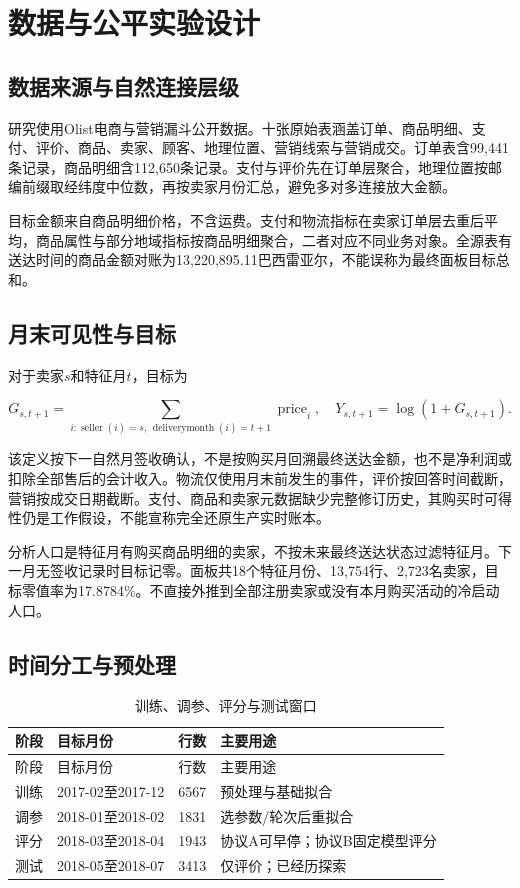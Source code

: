 \documentclass{sufethesismas}
\begin{document}
\chapter{数据与公平实验设计}

\section{数据来源与自然连接层级}

研究使用Olist电商与营销漏斗公开数据\cite{olist2018,funnel2018}。十张原始表涵盖订单、商品明细、支付、评价、商品、卖家、顾客、地理位置、营销线索与营销成交。订单表含99,441条记录，商品明细含112,650条记录。支付与评价先在订单层聚合，地理位置按邮编前缀取经纬度中位数，再按卖家月份汇总，避免多对多连接放大金额。

目标金额来自商品明细价格，不含运费。支付和物流指标在卖家订单层去重后平均，商品属性与部分地域指标按商品明细聚合，二者对应不同业务对象。全源表有送达时间的商品金额对账为13,220,895.11巴西雷亚尔，不能误称为最终面板目标总和。

\section{月末可见性与目标}

对于卖家\(s\)和特征月\(t\)，目标为

\[
G_{s,t+1}=\sum_{i:\operatorname{seller}(i)=s,\,
\operatorname{deliverymonth}(i)=t+1}\operatorname{price}_i,
\quad Y_{s,t+1}=\log(1+G_{s,t+1}).
\]

该定义按下一自然月签收确认，不是按购买月回溯最终送达金额，也不是净利润或扣除全部售后的会计收入。物流仅使用月末前发生的事件，评价按回答时间截断，营销按成交日期截断。支付、商品和卖家元数据缺少完整修订历史，其购买时可得性仍是工作假设，不能宣称完全还原生产实时账本。

分析人口是特征月有购买商品明细的卖家，不按未来最终送达状态过滤特征月。下一月无签收记录时目标记零。面板共18个特征月份、13,754行、2,723名卖家，目标零值率为17.8784\%。不直接外推到全部注册卖家或没有本月购买活动的冷启动人口。

\section{时间分工与预处理}

{
\footnotesize
\begin{longtable}[]{@{}llll@{}}
\caption{训练、调参、评分与测试窗口}\tabularnewline
\toprule\noalign{}
阶段 & 目标月份 & 行数 & 主要用途 \\
\midrule\noalign{}
\endfirsthead
\toprule\noalign{}
阶段 & 目标月份 & 行数 & 主要用途 \\
\midrule\noalign{}
\endhead
\bottomrule\noalign{}
\endlastfoot
训练 & 2017-02至2017-12 & 6567 & 预处理与基础拟合 \\
调参 & 2018-01至2018-02 & 1831 & 选参数/轮次后重拟合 \\
评分 & 2018-03至2018-04 & 1943 & 协议A可早停；协议B固定模型评分 \\
测试 & 2018-05至2018-07 & 3413 & 仅评价；已经历探索 \\
\end{longtable}
}
\end{document}
